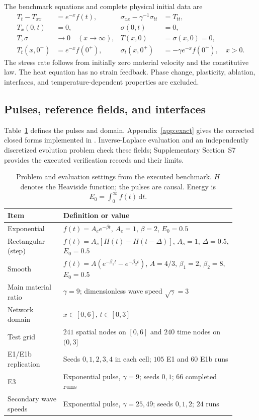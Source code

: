 \documentclass[11pt]{article}
\newcommand{\dd}{\mathrm d}
\begin{document}
The benchmark equations and complete physical initial data are
\begin{align}
 T_t-T_{xx}&=e^{-x}f(t),&
 \sigma_{xx}-\gamma^{-1}\sigma_{tt}&=T_{tt},\label{eq:pdes}\\
 T_x(0,t)&=0,&\sigma(0,t)&=0,\\
 T,\sigma&\longrightarrow0\quad(x\longrightarrow\infty),&
 T(x,0)&=\sigma(x,0)=0,\\
 T_t(x,0^+)&=e^{-x}f(0^+),&
 \sigma_t(x,0^+)&=-\gamma e^{-x}f(0^+),\quad x>0.
 \label{eq:rates}
\end{align}
The stress rate follows from initially zero material velocity and the
constitutive law. The heat equation has no strain feedback. Phase change,
plasticity, ablation, interfaces, and temperature-dependent properties
are excluded.

\subsection{Pulses, reference fields, and interfaces}

Table~\ref{tab:problem} defines the pulses and domain. Appendix~\ref{app:exact}
gives the corrected closed forms implemented in .
Inverse-Laplace evaluation \citep{deHoog1982} and an independently
discretized evolution problem check these fields; Supplementary
Section~S7 provides the executed verification records and their limits.

\begin{table}[htbp]
\centering
\caption{Problem and evaluation settings from the executed benchmark.
$H$ denotes the Heaviside function; the pulses are causal.
Energy is $E_0=\int_0^\infty f(t)\,\dd t$.}
\label{tab:problem}
\begin{tabular}{p{0.22\linewidth}p{0.68\linewidth}}
\toprule
Item & Definition or value \\
\midrule
Exponential & $f(t)=A_e e^{-\beta t}$, $A_e=1$, $\beta=2$, $E_0=0.5$ \\
Rectangular (step) & $f(t)=A_s[H(t)-H(t-\Delta)]$,
$A_s=1$, $\Delta=0.5$, $E_0=0.5$ \\
Smooth & $f(t)=A(e^{-\beta_1t}-e^{-\beta_2t})$,
$A=4/3$, $\beta_1=2$, $\beta_2=8$, $E_0=0.5$ \\
Main material ratio & $\gamma=9$; dimensionless wave speed $\sqrt\gamma=3$ \\
Network domain & $x\in[0,6]$, $t\in[0,3]$ \\
Test grid & $241$ spatial nodes on $[0,6]$ and $240$ time nodes on $(0,3]$ \\
E1/E1b replication & Seeds $0,1,2,3,4$ in each cell; $105$ E1 and $60$ E1b runs \\
E3 & Exponential pulse, $\gamma=9$; seeds $0,1$; $66$ completed runs \\
Secondary wave speeds & Exponential pulse, $\gamma=25,49$;
seeds $0,1,2$; $24$ runs \\
\bottomrule
\end{tabular}
\end{table}
\end{document}
